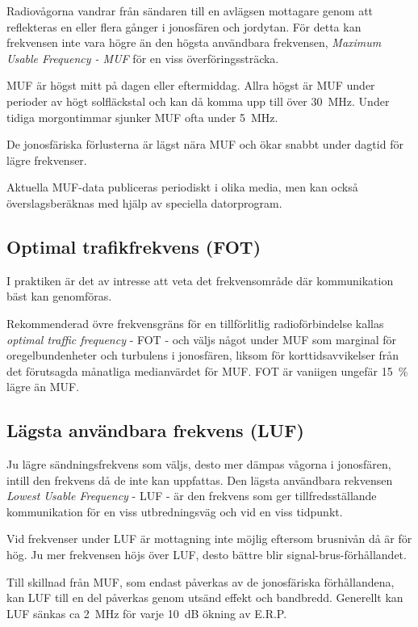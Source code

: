 Radiovågorna vandrar från sändaren till en avlägsen mottagare genom
att reflekteras en eller flera gånger i jonosfären och jordytan. För
detta kan frekvensen inte vara högre än den högsta användbara
frekvensen, \emph{Maximum Usable Frequency - MUF} för en viss
överföringssträcka.

MUF är högst mitt på dagen eller eftermiddag.
Allra högst är MUF under perioder av högt solfläckstal och kan då komma
upp till över 30~MHz.
Under tidiga morgontimmar sjunker MUF ofta under 5~MHz.

De jonosfäriska förlusterna är lägst nära MUF och ökar snabbt under
dagtid för lägre frekvenser.

Aktuella MUF-data publiceras periodiskt i olika media, men kan också
överslagsberäknas med hjälp av speciella datorprogram.

\subsection{Optimal trafikfrekvens (FOT)}

I praktiken är det av intresse att veta det frekvensområde där
kommunikation bäst kan genomföras.

Rekommenderad övre frekvensgräns för en tillförlitlig radioförbindelse
kallas \emph{optimal traffic frequency} - FOT - och väljs något under
MUF som marginal för oregelbundenheter och turbulens i jonosfären,
liksom för korttidsavvikelser från det förutsagda månatliga
medianvärdet för MUF. FOT är vaniigen ungefär 15~\% lägre än MUF.

\subsection{Lägsta användbara frekvens (LUF)}

Ju lägre sändningsfrekvens som väljs, desto mer dämpas vågorna i
jonosfären, intill den frekvens då de inte kan uppfattas. Den lägsta
användbara rekvensen \emph{Lowest Usable Frequency} - LUF - är den
frekvens som ger tillfredsställande kommunikation för en viss
utbredningsväg och vid en viss tidpunkt.

Vid frekvenser under LUF är mottagning inte möjlig eftersom brusnivån
då är för hög. Ju mer frekvensen höjs över LUF, desto bättre blir
signal-brus-förhållandet.

Till skillnad från MUF, som endast påverkas av de jonosfäriska
förhållandena, kan LUF till en del påverkas genom utsänd effekt och
bandbredd. Generellt kan LUF sänkas ca 2~MHz för varje 10~dB ökning
av E.R.P.

